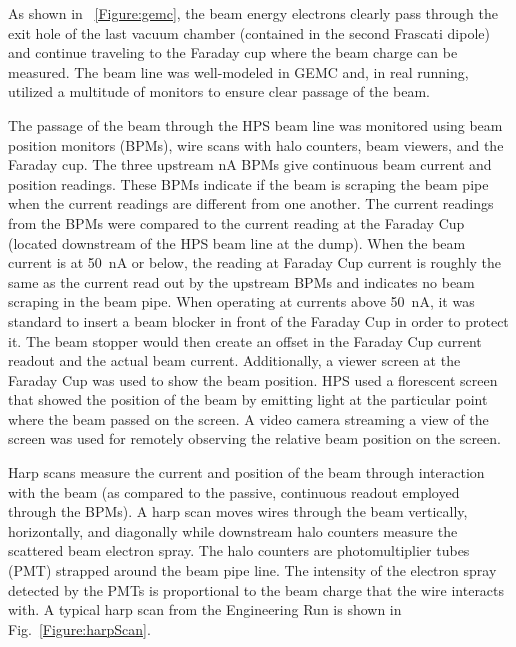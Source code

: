 As shown in ~\ref{Figure:gemc}, the beam energy electrons clearly pass through the exit hole of the last vacuum chamber (contained in the second Frascati dipole) and continue traveling to the Faraday cup where the beam charge can be measured. The beam line was well-modeled in GEMC and, in real running, utilized a multitude of monitors to ensure clear passage of the beam.

The passage of the beam through the HPS beam line was monitored using beam position monitors (BPMs), wire scans with halo counters, beam viewers, and the Faraday cup. The three upstream nA BPMs give continuous beam current and position readings. These BPMs indicate if the beam is scraping the beam pipe when the current readings are different from one another. The current readings from the BPMs were compared to the current reading at the Faraday Cup (located downstream of the HPS beam line at the dump). When the beam current is at 50~nA or below, the reading at Faraday Cup current is roughly the same as the current read out by the upstream BPMs and indicates no beam scraping in the beam pipe. When operating at currents above 50~nA, it was standard to insert a beam blocker in front of the Faraday Cup in order to protect it. The beam stopper would then create an offset in the Faraday Cup current readout and the actual beam current. Additionally, a viewer screen at the Faraday Cup was used to show the beam position. HPS used a florescent screen that showed the position of the beam by emitting light at the particular point where the beam passed on the screen. A video camera streaming a view of the screen was used for remotely observing the relative beam position on the screen.  

Harp scans measure the current and position of the beam through interaction with the beam (as compared to the passive, continuous readout employed through the BPMs). A harp scan moves wires through the beam vertically, horizontally, and diagonally while  downstream halo counters measure the scattered beam electron spray. The halo counters are photomultiplier tubes (PMT) strapped around the beam pipe line. The intensity of the electron spray detected by the PMTs is proportional to the beam charge that the wire interacts with. A typical harp scan from the Engineering Run is shown in Fig.~\ref{Figure:harpScan}.

